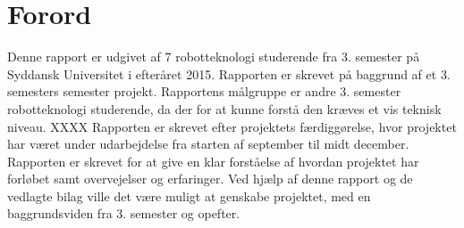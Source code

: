\section*{Forord}
Denne rapport er udgivet af 7 robotteknologi studerende fra 3. semester på Syddansk Universitet i efteråret 2015. Rapporten er skrevet på baggrund af et 3. semesters semester projekt. 
Rapportens målgruppe er andre 3. semester robotteknologi studerende, da der for at kunne forstå den kræves et vis teknisk niveau. XXXX
Rapporten er skrevet efter projektets færdiggørelse, hvor projektet har været under udarbejdelse fra starten af september til midt december.
Rapporten er skrevet for at give en klar forståelse af hvordan projektet har forløbet samt overvejelser og erfaringer.
Ved hjælp af denne rapport og de vedlagte bilag ville det være muligt at genskabe projektet, med en baggrundsviden fra 3. semester og opefter.